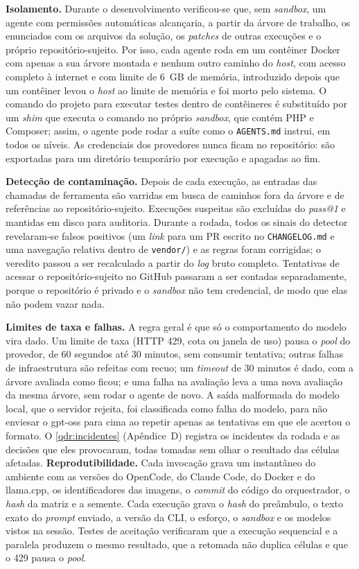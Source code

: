 \textbf{Isolamento.} Durante o desenvolvimento verificou-se que, sem
\textit{sandbox}, um agente com permissões automáticas alcançaria, a partir da
árvore de trabalho, os enunciados com os arquivos da solução, os
\textit{patches} de outras execuções e o próprio repositório-sujeito. Por
isso, cada agente roda em um contêiner Docker com apenas a sua árvore montada e
nenhum outro caminho do \textit{host}, com acesso completo à internet e com limite de 6~GB de memória, introduzido depois
que um contêiner levou o \textit{host} ao limite de memória e foi morto pelo
sistema. O comando do projeto para executar testes dentro de contêineres é
substituído por um \textit{shim} que executa o comando no próprio
\textit{sandbox}, que contém PHP e Composer; assim, o agente pode rodar a
suíte como o \texttt{AGENTS.md} instrui, em todos os níveis. As credenciais
dos provedores nunca ficam no repositório: são exportadas para um diretório
temporário por execução e apagadas ao fim.

\textbf{Detecção de contaminação.} Depois de cada execução, as entradas das
chamadas de ferramenta são varridas em busca de caminhos fora da árvore e de
referências ao repositório-sujeito. Execuções suspeitas são excluídas do
\textit{pass@1} e mantidas em disco para auditoria. Durante a rodada, todos os
sinais do detector revelaram-se falsos positivos (um \textit{link} para um PR
escrito no \texttt{CHANGELOG.md} e uma navegação relativa dentro de
\texttt{vendor/}) e as regras foram corrigidas; o veredito passou a ser
recalculado a partir do \textit{log} bruto completo. Tentativas de acessar o
repositório-sujeito no GitHub passaram a ser contadas separadamente, porque o
repositório é privado e o \textit{sandbox} não tem credencial, de modo que
elas não podem vazar nada.

\textbf{Limites de taxa e falhas.} A regra geral é que só o comportamento do
modelo vira dado. Um limite de taxa (HTTP 429, cota ou janela de uso) pausa o
\textit{pool} do provedor, de 60 segundos até 30 minutos, sem consumir
tentativa; outras falhas de infraestrutura são refeitas com recuo; um
\textit{timeout} de 30 minutos é dado, com a árvore avaliada como ficou; e uma
falha na avaliação leva a uma nova avaliação da mesma árvore, sem rodar o agente
de novo. A saída malformada do modelo local, que o servidor rejeita, foi
classificada como falha do modelo, para não enviesar o gpt-oss para cima ao
repetir apenas as tentativas em que ele acertou o formato. O
\autoref{qdr:incidentes} (Apêndice~D) registra os incidentes da rodada e as
decisões que eles provocaram, todas tomadas sem olhar o resultado das células
afetadas.
\textbf{Reprodutibilidade.} Cada invocação grava um instantâneo do ambiente
com as versões do OpenCode, do Claude Code, do Docker e do llama.cpp, os
identificadores das imagens, o \textit{commit} do código do orquestrador, o
\textit{hash} da matriz e a semente. Cada execução grava o \textit{hash} do
preâmbulo, o texto exato do \textit{prompt} enviado, a versão da CLI, o
esforço, o \textit{sandbox} e os modelos vistos na sessão. Testes de aceitação
verificaram que a execução sequencial e a paralela produzem o mesmo resultado,
que a retomada não duplica células e que o 429 pausa o \textit{pool}.

